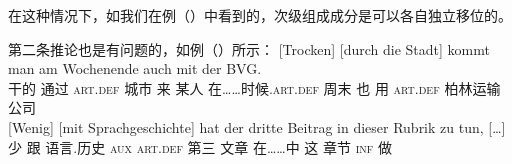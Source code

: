 \noindent
在这种情况下，如我们在例（）中看到的，次级组成成分是可以各自独立移位的。\citep{deKuthy2002a} 

第二条推论也是有问题的，如例（）所示：
\eal
\label{bsp-mehr-vf}
\ex\label{bsp-trocken-durch-die-stadt}
\gll {}[Trocken]       [durch        die          Stadt] kommt man am                       Wochenende auch mit der BVG.\footnotemark\\
       \spacebr{}干的 \spacebr{}通过 \textsc{art}.\textsc{def} 城市   来    某人 在……时候.\textsc{art}.\textsc{def} 周末 也 用 \textsc{art}.\textsc{def} 柏林运输公司\\
\ex 
\gll {}[Wenig]     [mit Sprachgeschichte] hat der dritte Beitrag in dieser Rubrik zu tun, [\ldots]\footnotemark\\
       \spacebr{}少 \spacebr{}跟 语言.历史 \textsc{aux} \textsc{art}.\textsc{def} 第三 文章 在……中 这 章节 \textsc{inf} 做\\
\zl

